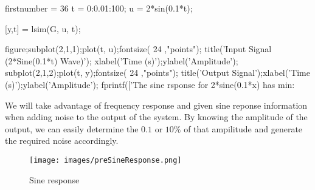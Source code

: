 \begin{code}
	\begin{matlabcode}{firstnumber = 36}
		t = 0:0.01:100;
		u = 2*sin(0.1*t);
		
		[y,t] = lsim(G, u, t);
		
		figure;subplot(2,1,1);plot(t, u);fontsize( 24 ,"points");
		title('Input Signal (2*Sine(0.1*t) Wave)');
		xlabel('Time (s)');ylabel('Amplitude');
		subplot(2,1,2);plot(t, y);fontsize( 24 ,"points");
		title('Output Signal');xlabel('Time (s)');ylabel('Amplitude');
		fprintf(['The sine rsponse for 2*sine(0.1*x) has min: %
	\end{matlabcode}
	\label{code:preSineResponse}
\end{code}

We will take advantage of frequency response and given sine reponse information when adding noise to the output of the system. By knowing the amplitude of the output, we can easily determine the $0.1$ or $10\%$ of that ampilitude and generate the required noise accordingly. 

\begin{figure}
	\centering
	\texttt{[image: images/preSineResponse.png]}
	\caption{Sine response}
	\label{fig:preSineResponse}
\end{figure}

